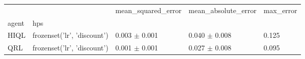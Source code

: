 \begin{tabular}{lllll}
\toprule
 &  & mean_squared_error & mean_absolute_error & max_error \\
agent & hps &  &  &  \\
\midrule
HIQL & frozenset({'lr', 'discount'}) & 0.003 $\pm$ 0.001 & 0.040 $\pm$ 0.008 & 0.125 \\
\cline{1-5}
QRL & frozenset({'lr', 'discount'}) & 0.001 $\pm$ 0.001 & 0.027 $\pm$ 0.008 & 0.095 \\
\cline{1-5}
\bottomrule
\end{tabular}
